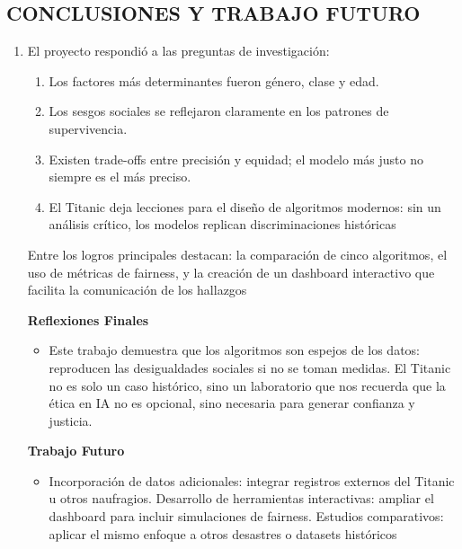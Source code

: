 \documentclass[sjournal]{IEEEtran}
\begin{document}
\subsection{\textbf{CONCLUSIONES Y TRABAJO FUTURO}}


\begin{enumerate}[label=\textbf{\arabic*.}]
\textbf{Resumen de contribuciones  }

    \item  El proyecto respondió a las preguntas de investigación:

\begin{enumerate}
    \item Los factores más determinantes fueron género, clase y edad.
    \item Los sesgos sociales se reflejaron claramente en los patrones de supervivencia.
    \item Existen trade-offs entre precisión y equidad; el modelo más justo no siempre es el más preciso.
    \item El Titanic deja lecciones para el diseño de algoritmos modernos: sin un análisis crítico, los modelos replican discriminaciones históricas
\end{enumerate}
Entre los logros principales destacan: la comparación de cinco algoritmos, el uso de métricas de fairness, y la creación de un dashboard interactivo que facilita la comunicación de los hallazgos
 
\textbf{Reflexiones Finales} 
          \begin{itemize}
              \item Este trabajo demuestra que los algoritmos son espejos de los datos: reproducen las desigualdades sociales si no se toman medidas. El Titanic no es solo un caso histórico, sino un laboratorio que nos recuerda que la ética en IA no es opcional, sino necesaria para generar confianza y justicia.
          \end{itemize}

\textbf{Trabajo Futuro} 
          \begin{itemize}
              \item Incorporación de datos adicionales: integrar registros externos del Titanic u otros naufragios.
Desarrollo de herramientas interactivas: ampliar el dashboard para incluir simulaciones de fairness.
Estudios comparativos: aplicar el mismo enfoque a otros desastres o datasets históricos

          \end{itemize}
\end{enumerate}
\end{document}
